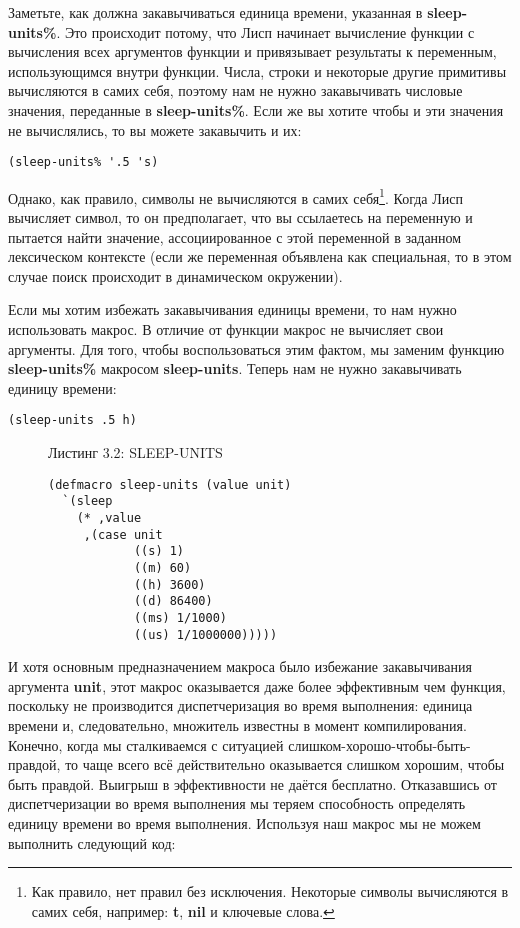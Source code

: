Заметьте, как должна закавычиваться единица времени, указанная в \textbf{sleep-units\%}. Это происходит потому, что Лисп начинает вычисление функции с вычисления всех аргументов функции и привязывает результаты к переменным, использующимся внутри функции. Числа, строки и некоторые другие примитивы вычисляются в самих себя, поэтому нам не нужно закавычивать числовые значения, переданные в \textbf{sleep-units\%}. Если же вы хотите чтобы и эти значения не вычислялись, то вы можете закавычить и их:

\begin{verbatim}
(sleep-units% '.5 's)
\end{verbatim}

Однако, как правило, символы не вычисляются в самих себя\footnote{Как правило, нет правил без исключения. Некоторые символы вычисляются в самих себя, например: \textbf{t}, \textbf{nil} и ключевые слова.}. Когда Лисп вычисляет символ, то он предполагает, что вы ссылаетесь на переменную и пытается найти значение, ассоциированное с этой переменной в заданном лексическом контексте (если же переменная объявлена как специальная, то в этом случае поиск происходит в динамическом окружении).

Если мы хотим избежать закавычивания единицы времени, то нам нужно использовать макрос. В отличие от функции макрос не вычисляет свои аргументы. Для того, чтобы воспользоваться этим фактом, мы заменим функцию \textbf{sleep-units\%} макросом \textbf{sleep-units}. Теперь нам не нужно закавычивать единицу времени:

\begin{verbatim}
(sleep-units .5 h)
\end{verbatim}

\begin{figure}Листинг 3.2: SLEEP-UNITS\label{listing_3.2}
\listbegin
\begin{verbatim}
(defmacro sleep-units (value unit)
  `(sleep
    (* ,value
     ,(case unit
            ((s) 1)
            ((m) 60)
            ((h) 3600)
            ((d) 86400)
            ((ms) 1/1000)
            ((us) 1/1000000)))))
\end{verbatim}
\listend
\end{figure}

И хотя основным предназначением макроса было избежание закавычивания аргумента \textbf{unit}, этот макрос оказывается даже более эффективным чем функция, поскольку не производится диспетчеризация во время выполнения: единица времени и, следовательно, множитель известны в момент компилирования. Конечно, когда мы сталкиваемся с ситуацией слишком-хорошо-чтобы-быть-правдой, то чаще всего всё действительно оказывается слишком хорошим, чтобы быть правдой. Выигрыш в эффективности не даётся бесплатно. Отказавшись от диспетчеризации во время выполнения мы теряем способность определять единицу времени во время выполнения. Используя наш макрос мы не можем выполнить следующий код:

